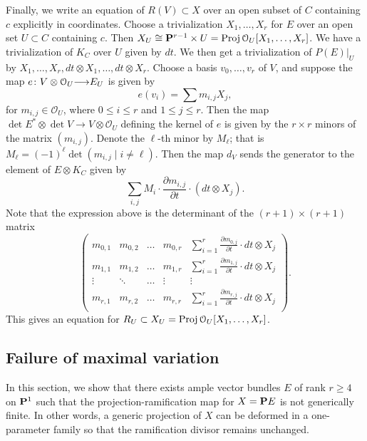 \documentclass[11pt,reqno]{amsart}
\theoremstyle{plain}
\theoremstyle{definition}
\theoremstyle{remark}
\numberwithin{equation}{section}
\renewcommand{\to}{{\longrightarrow}}
\numberwithin{equation}{section}
\renewcommand{\O}{\mathcal O}
\newcommand{\Proj}{{\text{\rm Proj}\,}}
\begin{document}
Finally, we write an equation of $R(V) \subset X$ over an open subset of $C$ containing $c$ explicitly in coordinates.
Choose a trivialization $X_1, \dots, X_r$ for $E$ over an open set $U \subset C$ containing $c$.
Then $X_U \cong \P^{r-1} \times U = \Proj \O_U[X_1, \dots, X_r]$.
We have a trivialization of $K_C$ over $U$ given by $dt$.
We then get a trivialization of $P(E)|_U$ by $X_1, \dots, X_r, dt \otimes X_1, \dots, dt \otimes X_r$.
Choose a basis $v_0, \dots, v_r$ of $V$, and suppose the map $e \from V \otimes \O_U \to E_U$ is given by
\[ e(v_i) = \sum m_{i,j} X_j,\]
for $m_{i,j} \in \O_U$, where $0 \leq i \leq r$ and $1 \leq j \leq r$.
Then the map $\det E^* \otimes \det V \to V \otimes \O_U$ defining the kernel of $e$ is given by the $r \times r$ minors of the matrix $(m_{i,j})$.
Denote the $\ell$-th minor by $M_\ell$; that is $M_\ell = (-1)^{\ell}\det (m_{i,j} \mid i \neq \ell)$.
Then the map $d_V$ sends the generator to the element of $E \otimes K_C$ given by
\[ \sum_{i,j} M_i \cdot \frac{\partial m_{i,j}}{\partial t} \cdot (dt \otimes X_j).\]
Note that the expression above is the determinant of the $(r+1) \times (r+1)$ matrix
\begin{equation}\label{eqn:Rmatrix}
  \begin{pmatrix}
  m_{0,1} & m_{0,2} & \dots & m_{0,r} & \sum_{i = 1}^r \frac {\partial m_{0,j}}{\partial t} \cdot dt \otimes X_j \\
  m_{1,1} & m_{1,2} & \dots & m_{1,r} & \sum_{i = 1}^r \frac {\partial m_{1,j}}{\partial t} \cdot dt \otimes X_j \\
  \vdots & \ddots & \dots & \vdots & \vdots \\
  m_{r,1} & m_{r,2} & \dots & m_{r,r} & \sum_{i = 1}^r \frac {\partial m_{r,j}}{\partial t} \cdot dt \otimes X_j \\
\end{pmatrix}.
\end{equation}
This gives an equation for $R_U \subset X_U = \Proj \O_U[X_1, \dots, X_r]$.

\subsection{Failure of maximal variation}
In this section, we show that there exists ample vector bundles $E$ of rank $r \geq 4$ on $\P^1$ such that the projection-ramification map for $X = \P E$ is not generically finite.
In other words, a generic projection of $X$ can be deformed in a one-parameter family so that the ramification divisor remains unchanged.
\end{document}
